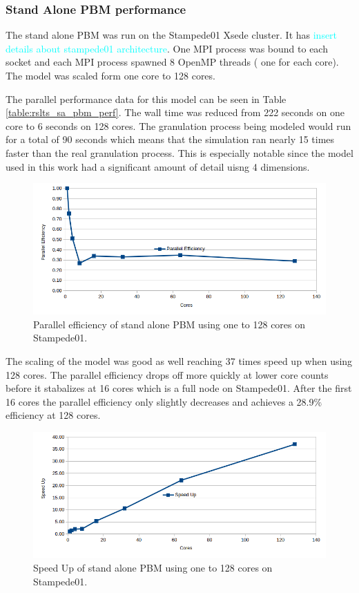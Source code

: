 \documentclass[preprint,11pt,authoryear]{elsarticle}
\begin{document}
\subsubsection{Stand Alone PBM performance}
The stand alone PBM was run on the Stampede01 Xsede cluster. It has \textcolor{cyan}{insert details about stampede01 architecture}. One MPI process was bound to each socket and each MPI process spawned 8 OpenMP threads ( one for each core). The model was scaled form one core to 128 cores.

The parallel performance data for this model can be seen in Table
\ref{table:rslts_sa_pbm_perf}. The wall time was reduced from 222 seconds on one core to 6 seconds on 128 cores. The granulation process being modeled would run for a total of 90 seconds which means that the simulation ran nearly 15 times faster than the real granulation process. This is especially notable since the model used in this work had a significant amount of detail uisng 4 dimensions.


\begin{figure}[H]
\begin{center}
\includegraphics[scale=0.5]{fig_rslts_sa_pbm_parallel_efficiency.png}
\caption{Parallel efficiency of stand alone PBM using one to 128 cores on Stampede01. }
\label{fig:rslts_sa_pbm_pll_effic}
\end{center}
\end{figure}


The scaling of the model was good as well reaching 37 times speed up when using 128 cores. The parallel efficiency drops off more quickly at lower core counts before it stabalizes at 16 cores which is a full node on Stampede01. After the first 16 cores the parallel efficiency only slightly decreases and achieves a 28.9$\%$ efficiency at 128 cores.

\begin{figure}[H]
\centering
\includegraphics[scale=0.5]{fig_rslts_sa_pbm_speed_up.png}
\caption{Speed Up of stand alone PBM using one to 128 cores on Stampede01. }
\label{fig:rslts_sa_pbm_speedup}
\end{figure}
\end{document}
